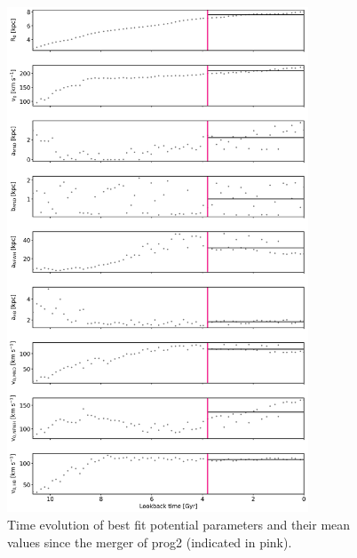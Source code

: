 \begin{figure}[htbp]
\captionsetup{format=plain}
    \centering
	\includegraphics[width=0.8\textwidth]{plots/Dynamics/mean_pot/potential_evolution_with_mean_dec18.png}
    \caption{Time evolution of best fit potential parameters and their mean values since the merger of prog2 (indicated in pink).}\label{fig:potential_mean_evolution}
\end{figure}

